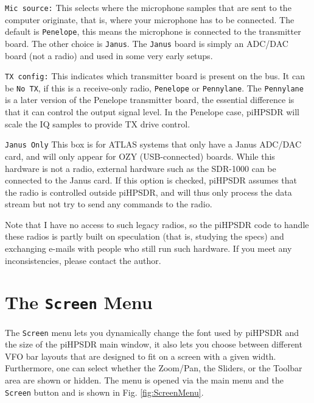 \documentclass[12pt]{book}
\def\rett#1{\texttt{\color{red}#1}}
\def\bltt#1{\texttt{\color{blue}#1}}
\def\pH{pi\-HPSDR\xspace}
\begin{document}
\rett{Mic source:} This selects where the microphone samples that are sent to the computer
originate, that is, where your microphone has to be connected. The default is
\texttt{Penelope}, this means the microphone is connected to the transmitter board. The
other choice is \texttt{Janus}. The \texttt{Janus} board is simply an ADC/DAC board (not
a radio) and used in some very early setups.

\rett{TX config:} This indicates which transmitter board is present on the bus. It can
be \texttt{No TX}, if this is a receive-only radio, \texttt{Penelope} or \texttt{Pennylane}.
The \texttt{Pennylane} is a later version of the Penelope transmitter board, the essential
difference is that it can control the output signal level. In the Penelope case,
\pH will scale the IQ samples to provide TX drive control.

\rett{Janus Only} This box is for ATLAS systems that only have a Janus ADC/DAC card,
and will only appear for OZY (USB-connected) boards. While this hardware is not a radio,
external hardware such as the SDR-1000 can be connected to the Janus card. If this
option is checked, \pH assumes that the radio is controlled outside \pH, and
will thus only process the data stream but not try to send any commands to the radio.

Note that I have no access to such legacy radios, so the \pH code to handle these radios
is partly built on speculation (that is, studying the specs) and exchanging e-mails with
people who still run such hardware. If you meet any inconsistencies, please contact
the author.

\section{The \texttt{Screen} Menu}

The \bltt{Screen} menu lets you dynamically change the font used by \pH and
the size of the \pH main
window, it also lets you choose between different VFO bar layouts that are designed to fit
on a screen with a given width. Furthermore, one
can select whether the Zoom/Pan, the Sliders, or the Toolbar area are shown or hidden.
 The menu is opened
via the main menu and the \bltt{Screen} button and is shown in Fig. \ref{fig:ScreenMenu}.
\end{document}
